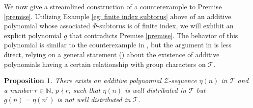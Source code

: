 \documentclass[11pt]{amsart}
\theoremstyle{theorem}
\newtheorem{proposition}[theorem]{Proposition}
\theoremstyle{definition}
\newcommand{\N}{\mathbb{N}}
\newcommand{\mZ}{\mathcal{Z}}
\newcommand{\mT}{\mathcal{T}}
\begin{document}
We now give a streamlined construction of a counterexample to Premise \ref{premise}.
Utilizing Example \ref{eg: finite index subtorus} above of an additive polynomial whose associated $\Phi$-subtorus is of finite index, we will exhibit an explicit polynomial $g$ that contradicts Premise \ref{premise}.
The behavior of this polynomial is similar to the counterexample in \cite{cgllw}, but the argument in \cite{cgllw} is less direct, relying on a general statement (\cite[Theorem 5.3]{cgllw}) about the existence of additive polynomials having a certain relationship with group characters on $\mT$.

\begin{proposition}
	There exists an additive polynomial $\mZ$-sequence $\eta(n)$ in $\mT$ and a number $r \in \N$, $p \nmid r$, such that $\eta(n)$ is well distributed in $\mT$ but $g(n) = \eta(n^r)$ is not well distributed in $\mT$.
\end{proposition}
\end{document}
